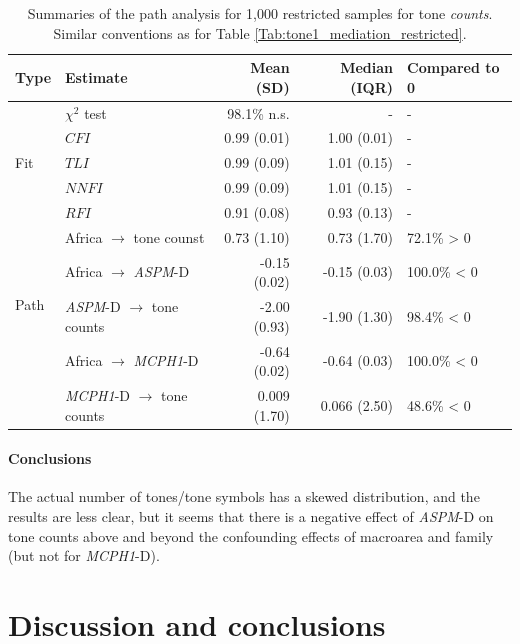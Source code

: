\documentclass[twoside,onecolumn]{article}
\begin{document}
\begin{table}[h]
  \caption{Summaries of the path analysis for 1,000 restricted samples for tone \textit{counts}. Similar conventions as for Table \ref{Tab:tone1_mediation_restricted}.}
  \label{Tab:tone_counts_path_restricted}
  \centering
  \begin{tabular}{|l|l|r|r|l|}
    \toprule
    \textbf{Type} & \textbf{Estimate} & \textbf{Mean (SD)} & \textbf{Median (IQR)} & \textbf{Compared to 0} \\
    \midrule
    \multirow{5}{*}{Fit} & $\chi^2$ test & 98.1\% n.s. & - & - \\
    & $CFI$  & 0.99 (0.01) & 1.00 (0.01) & - \\
    & $TLI$  & 0.99 (0.09) & 1.01 (0.15) & - \\
    & $NNFI$ & 0.99 (0.09) & 1.01 (0.15) & - \\
    & $RFI$  & 0.91 (0.08) & 0.93 (0.13) & - \\
    \midrule
    \multirow{4}{*}{Path} & Africa $\rightarrow$ tone counst & 0.73 (1.10) & 0.73 (1.70) & 72.1\% > 0 \\
    & Africa $\rightarrow$ \textit{ASPM}-D  & -0.15 (0.02) & -0.15 (0.03) & 100.0\% < 0 \\
    & \textit{ASPM}-D  $\rightarrow$ tone counts & -2.00 (0.93) & -1.90 (1.30) & 98.4\% < 0 \\
    & Africa $\rightarrow$ \textit{MCPH1}-D & -0.64 (0.02) & -0.64 (0.03) & 100.0\% < 0 \\
    & \textit{MCPH1}-D $\rightarrow$ tone counts & 0.009 (1.70) & 0.066 (2.50) & 48.6\% < 0 \\
    \bottomrule
  \end{tabular}
\end{table}


\paragraph{Conclusions}

The actual number of tones/tone symbols has a skewed distribution, and the results are less clear, but it seems that there is a negative effect of \textit{ASPM}-D on tone counts above and beyond the confounding effects of macroarea and family (but not for \textit{MCPH1}-D).




\section{Discussion and conclusions}
\end{document}
